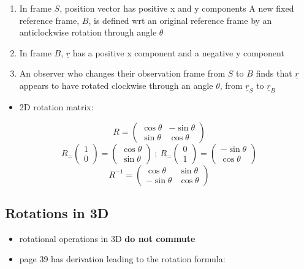 \documentclass[a4paper,11pt,normalem]{article}
\begin{document}
\begin{enumerate}
\item
  In frame \(S\), position vector has positive x and y components A new
  fixed reference frame, \(B\), is defined wrt an original reference
  frame by an anticlockwise rotation through angle \(\theta\)
\item
  In frame \(B\), \(\underline{r}\) has a positive x component and a
  negative y component
\item
  An observer who changes their observation frame from \(S\) to \(B\)
  finds that \(\underline{r}\) appears to have rotated clockwise through
  an angle \(\theta\), from \(\underline{r}_S\) to \(\underline{r}_B\)
\end{enumerate}

\begin{itemize}
\item
  2D rotation matrix:
\end{itemize}

\[
    R = \begin{pmatrix} \cos\theta & -\sin\theta \\ \sin\theta & \cos\theta \end{pmatrix} \]
\[
    R_=\begin{pmatrix} 1 \\ 0 \end{pmatrix} = \begin{pmatrix} \cos\theta \\ \sin\theta \end{pmatrix} ~;~ R_=\begin{pmatrix} 0 \\ 1 \end{pmatrix} = \begin{pmatrix} -\sin\theta \\ \cos\theta \end{pmatrix} \]
\[
    R^{-1} = \begin{pmatrix} \cos\theta & \sin\theta \\ -\sin\theta & \cos\theta \end{pmatrix}
\]

\subsection{Rotations in 3D}\label{rotations-in-3d}

\begin{itemize}
\item
  rotational operations in 3D \textbf{do not commute}
\item
  page 39 has derivation leading to the rotation formula:
\end{itemize}
\end{document}
